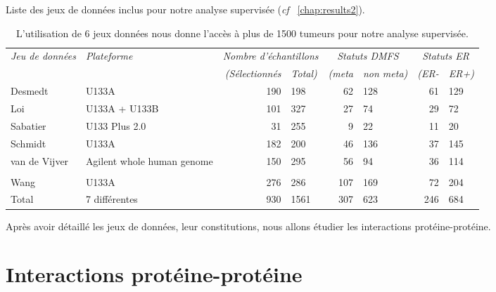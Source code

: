 			\begin{table}
				\begin{center}
					\caption{Liste des jeux de données inclus pour notre analyse supervisée \citep{Garcia2012} (\emph{cf} ~\ref{chap:results2}).}
					\begin{tabular}{llr@{/}lr@{/}lr@{/}l}
						\toprule
						\emph{Jeu de données} & \emph{Plateforme}	& \multicolumn{2}{c}{\emph{Nombre d'échantillons}}	& \multicolumn{2}{c}{\emph{Statuts DMFS}} & \multicolumn{2}{c}{\emph{Statuts ER}} \\
						\cmidrule(r){3-8}
						&  & \emph{(Sélectionnés} & \emph{Total)}	& \emph{(meta} & \emph{non meta)} & \emph{(ER-}	& \emph{ER+)} \\
						\midrule
						Desmedt						& U133A												& 190	&198	& 62	& 128	& 61	& 129	\\
						Loi							& U133A + U133B										& 101	&327	& 27	& 74	& 29	& 72	\\
						Sabatier					& U133 Plus 2.0										& 31	&255	& 9		& 22	& 11	& 20	\\
						Schmidt						& U133A												& 182	&200	& 46	& 136	& 37	& 145	\\
						van de Vijver				& \multirow{2}{2.49cm}{Agilent whole human genome}	& 150	&295	& 56	& 94	& 36	& 114	\\
						& \\
						Wang						& U133A												& 276	&286	& 107	& 169	& 72	& 204	\\
						\midrule
						Total						& 7 différentes										& 930	&1561	& 307	& 623	& 246	& 684	\\
						\bottomrule
					\end{tabular}
					\label{tab:Met:DSS}
					\vspace{5ex}
					\caption*{L'utilisation de 6 jeux données nous donne l'accès à plus de 1500 tumeurs pour notre analyse supervisée.}
				\end{center}
			\end{table}

			Après avoir détaillé les jeux de données, leur constitutions, nous allons étudier les interactions protéine-protéine.

			\pagebreak

	\section{\textcolor{mygreen}{Interactions protéine-protéine}}\label{sec:IPP}


